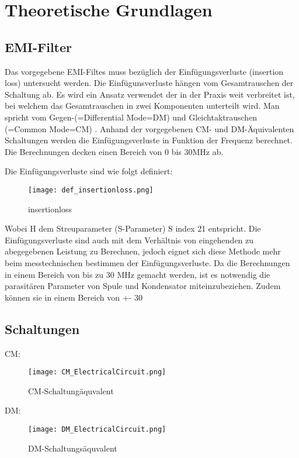 \section{Theoretische Grundlagen} \label{sec:TheoretischeGrundlagen}

\subsection{EMI-Filter} \label{subsec:emifilter}
Das vorgegebene EMI-Filtes muss bezüglich der Einfügungsverluste (insertion loss) untersucht werden. Die Einfügunsverluste hängen vom Gesamtrauschen der Schaltung ab. Es wird ein Ansatz verwendet der in der Praxis weit verbreitet ist, bei welchem das Gesamtrauschen in zwei Komponenten unterteilt wird. Man spricht vom Gegen-(=Differential Mode=DM) und Gleichtaktrauschen (=Common Mode=CM) . Anhand der vorgegebenen CM- und DM-Äquivalenten Schaltungen werden die Einfügungsverluste in Funktion der Frequenz berechnet. Die Berechnungen decken einen Bereich von 0 bis 30MHz ab.

Die Einfügungsverluste sind wie folgt definiert: 

\begin{figure}[H]
	\centering
	\texttt{[image: def\_insertionloss.png]}
	\caption{insertionloss}
	\label{fig:insertion loss}
\end{figure}
Wobei H dem Streuparameter (S-Parameter) S index 21 entspricht. Die Einfügungsverluste sind auch mit dem Verhältnis von eingehenden zu abegegebenen Leistung zu Berechnen, jedoch eignet sich diese Methode mehr beim messtechnischen bestimmen der Einfügungsverluste. Da die Berechnungen in einem Bereich von bis zu 30 MHz gemacht werden, ist es notwendig die parasitären Parameter von Spule und Kondensator miteinzubeziehen. Zudem können sie in einem Bereich von +- 30%

\subsection{Schaltungen} \label{subsec:schaltungen}
CM:
\begin{figure}[H]
	\centering
	\texttt{[image: CM\_ElectricalCircuit.png]}
	\caption{CM-Schaltungäquvalent}
	\label{fig:CM-Schaltungäquvalent}
\end{figure}
DM:
\begin{figure}[H]
	\centering
	\texttt{[image: DM\_ElectricalCircuit.png]}
	\caption{DM-Schaltungsäquvalent}
	\label{fig:DM-Schaltungsäquvalent}
\end{figure}
